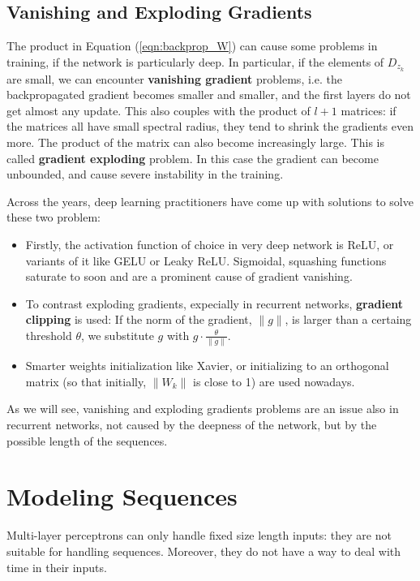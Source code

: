 \documentclass[oneside]{book}
\theoremstyle{definition}
\theoremstyle{plain}
\begin{document}
\subsection{Vanishing and Exploding Gradients}
The product in Equation  (\ref{eqn:backprop_W}) can cause some problems in training, if the network is particularly deep. In particular, if the elements of $D_{z_k}$ are small, we can encounter \textbf{vanishing gradient} problems, i.e. the backpropagated gradient becomes smaller and smaller, and the first layers do not get almost any update.  This also couples with the product of $l+1$ matrices: if the matrices all have small spectral radius, they tend to shrink the gradients even more.
The product of the matrix can also become increasingly large. This is called \textbf{gradient exploding} problem. In this case the gradient can become unbounded, and cause severe instability in the training. 

Across the years, deep learning practitioners have come up  with solutions to solve these two problem:
\begin{itemize}
    \item Firstly, the activation function of choice in very deep network is ReLU, or variants of it like GELU or Leaky ReLU. Sigmoidal, squashing functions saturate to soon and are a prominent cause of gradient vanishing.
    \item To contrast exploding gradients, expecially in recurrent networks, \textbf{gradient clipping} is used: If the norm of the gradient, $\|g\|$,  is larger than a certaing threshold $\theta$, we substitute $g$ with $g \cdot \frac{\theta}{\|g\|}$. 
    \item Smarter weights initialization like Xavier, or initializing to an orthogonal matrix (so that initially, $\|W_k\|$ is close to 1) are used nowadays. 
\end{itemize}

As we will see, vanishing and exploding gradients problems are an issue also in recurrent networks, not caused by the deepness of the network, but by the possible length of the sequences.
\section{Modeling Sequences}
Multi-layer perceptrons can only handle fixed size length inputs: they are not suitable for handling sequences. Moreover, they do not have a way to deal with time in their inputs.
\end{document}
